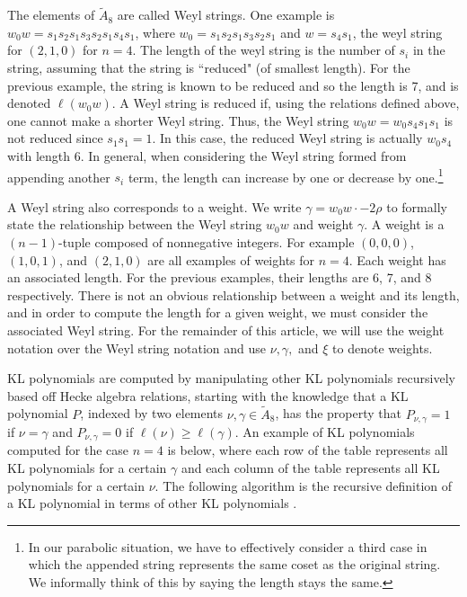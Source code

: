 \documentclass[12pt]{article} %
\begin{document}
The elements of $\tilde A_8$ are called Weyl strings. One example is $w_0w  = s_1s_2s_1s_3s_2s_1 s_4s_1$, where $w_0  = s_1s_2s_1s_3s_2s_1$ and $w = s_4s_1$, the weyl string for $( 2 , 1 , 0 )$ for $n=4$. The length of the weyl string is the number of $s_i$ in the string, assuming that the string is ``reduced" (of smallest length).  For the previous example, the string is known to be reduced and so the length is 7, and is denoted $\ell(w_0w)$. A Weyl string is reduced if, using the relations defined above, one cannot make a shorter Weyl string. Thus, the Weyl string $w_0w  = w_0s_4s_1s_1$ is not reduced since $s_1s_1 = 1$. In this case, the reduced Weyl string is actually  $w_0s_4$ with length 6. In general, when considering the Weyl string formed from appending another $s_i$ term, the length can increase by one or decrease by one.\footnote{In our parabolic situation, we have to effectively consider a third case in which the appended string represents the same coset as the original string. We informally think of this by saying the length stays the same.}

A Weyl string also corresponds to a weight. We write $\gamma = w_0w \cdot -2\rho$ to formally state the relationship between the Weyl string $w_0 w$ and weight $\gamma$. A weight is a $(n-1)$-tuple composed of nonnegative integers. For example $( 0 , 0 , 0 )$, $( 1 , 0 , 1 )$, and
$( 2 , 1 , 0 )$ are all examples of weights for $n = 4$. Each weight has an associated length. For the previous examples, their lengths are 6, 7, and 8 respectively. There is not an obvious relationship between a weight and its length, and in order to compute the length for a given weight, we must consider the associated Weyl string. For the remainder of this article, we will use the weight notation over the Weyl string notation and use $\nu, \gamma,$ and $\xi$ to denote weights.

KL polynomials are computed by manipulating other KL polynomials recursively based off Hecke algebra relations, starting with the knowledge that a KL polynomial $P$, indexed by two elements $\nu, \gamma \in \tilde A_8$, has the property that $P_{\nu,\gamma} = 1$ if $\nu = \gamma$ and $P_{\nu,\gamma} = 0$ if $\ell(\nu) \geq \ell(\gamma)$. An example of KL polynomials computed for the case $n=4$ is below, where each row of the table represents all KL polynomials for a certain $\gamma$ and each column of the table represents all KL polynomials for a certain $\nu$. The following algorithm is the recursive definition of a KL polynomial in terms of other KL polynomials \citep{kazhdan79, deodhar87}.
\end{document}
